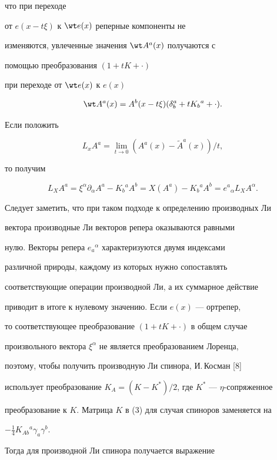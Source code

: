 что при переходе


от $e(x-t\xi)$ к $\wt e(x)$ реперные компоненты не


изменяются, увлеченные значения $\wt A^a(x)$ получаются с


помощью преобразования $(1+tK+\cdot)$


при переходе от $\wt e(x)$ к $e(x)$


$$


\wt A^a(x)=A^b(x-t\xi)(\delta^a_b+tK_b{}^a+\cdot).


$$


Если положить


$$


L_xA^a=\lim_{t\to0}{(A^a(x)-\widetilde A^a(x))}/t,


$$


то получим


\begin{equation}


L_XA^a=\xi^\alpha\partial_\alpha A^a-K_b{}^a A^b=


X(A^a)-K_b{}^aA^b=e^a{}_\alpha L_XA^\alpha.


\end{equation}


Следует заметить, что при таком подходе к определению производных Ли


вектора производные Ли векторов репера оказываются равными


нулю. Векторы репера $e_a{}^\alpha$ характеризуются двумя индексами


различной природы, каждому из которых нужно сопоставлять


соответствующие операции производной Ли, а их суммарное действие


приводит в итоге к нулевому значению. Если $e(x)$ --- ортрепер,


то соответствующее преобразование $(1+tK+\cdot)$ в общем случае


произвольного вектора $\xi^\alpha$ не является преобразованием Лоренца,


поэтому, чтобы получить производную Ли спинора, И.\,Косман [8]


использует преобразование $K_A=(K-K^*)/2$, где $K^*$ --- $\eta$-сопряженное


преобразование к $K$. Матрица $K$ в (3) для случая спиноров заменяется на


$-\frac{1}{4}K_{Ab}{}^a\gamma_a\gamma^b$.


Тогда для производной Ли спинора получается выражение


